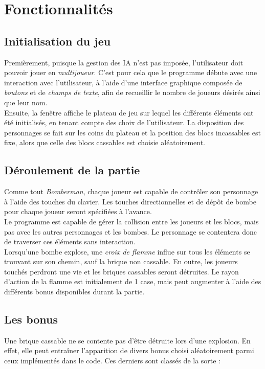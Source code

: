 \newpage
\section{Fonctionnalités}
\subsection{Initialisation du jeu}
Premièrement, puisque la gestion des IA n'est pas imposée, l'utilisateur doit pouvoir jouer en \textit{multijoueur}. C'est pour cela que le programme débute avec une interaction avec l'utilisateur, à l'aide d'une interface graphique composée de \textit{boutons} et de \textit{champs de texte}, afin de recueillir le nombre de joueurs désirés ainsi que leur nom. \\
Ensuite, la fenêtre affiche le plateau de jeu sur lequel les différents éléments ont été initialisés, en tenant compte des choix de l'utilisateur. La disposition des personnages se fait sur les coins du plateau et la position des blocs incassables est fixe, alors que celle des blocs cassables est choisie aléatoirement. 

\subsection{Déroulement de la partie}
Comme tout \textit{Bomberman}, chaque joueur est capable de contrôler son personnage à l'aide des touches du clavier. Les touches directionnelles et de dépôt de bombe pour chaque joueur seront spécifiées à l'avance. \\
Le programme est capable de gérer la collision entre les joueurs et les blocs, mais pas avec les autres personnages et les bombes. Le personnage se contentera donc de traverser ces éléments sans interaction. \\
Lorsqu'une bombe explose, une \textit{croix de flamme} influe sur tous les éléments se trouvant sur son chemin, sauf la brique non cassable. En outre, les joueurs touchés perdront une vie et les briques cassables seront détruites. Le rayon d'action de la flamme est initialement de 1 case, mais peut augmenter à l'aide des différents bonus disponibles durant la partie. 

\subsection{Les bonus}
Une brique cassable ne se contente pas d'être détruite lors d'une explosion. En effet, elle peut entraîner l'apparition de divers bonus choisi aléatoirement parmi ceux implémentés dans le code. Ces derniers sont classés de la sorte : 

